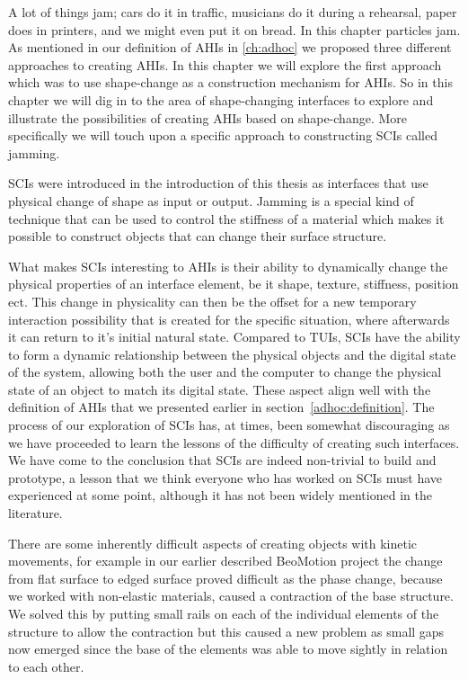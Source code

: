 
A lot of things jam; cars do it in traffic, musicians do it during a rehearsal, paper does in printers, and we might even put it on bread.
In this chapter particles jam.
\blank
As mentioned in our definition of AHIs in \autoref{ch:adhoc} we proposed three different approaches to creating AHIs.
In this chapter we will explore the first approach which was to use shape-change as a construction mechanism for AHIs.
So in this chapter we will dig in to the area of shape-changing interfaces to explore and illustrate the possibilities of creating AHIs based on shape-change.
More specifically we will touch upon a specific approach to constructing SCIs called jamming.

SCIs were introduced in the introduction of this thesis as interfaces that use physical change of shape as input or output.
Jamming is a special kind of technique that can be used to control the stiffness of a material which makes it possible to construct objects that can change their surface structure.

What makes SCIs interesting to AHIs is their ability to dynamically change the physical properties of an interface element, be it shape, texture, stiffness, position ect.
This change in physicality can then be the offset for a new temporary interaction possibility that is created for the specific situation, where afterwards it can return to it's initial natural state.
Compared to TUIs, SCIs have the ability to form a dynamic relationship between the physical objects and the digital state of the system, allowing both the user and the computer to change the physical state of an object to match its digital state.
These aspect align well with the definition of AHIs that we presented earlier in section~\ref{adhoc:definition}.
\blank
The process of our exploration of SCIs has, at times, been somewhat discouraging as we have proceeded to learn the lessons of the difficulty of creating such interfaces.
We have come to the conclusion that SCIs are indeed non-trivial to build and prototype, a lesson that we think everyone who has worked on SCIs must have experienced at some point, although it has not been widely mentioned in the literature. 

There are some inherently difficult aspects of creating objects with kinetic movements, for example in our earlier described BeoMotion project the change from flat surface to edged surface proved difficult as the phase change, because we worked with non-elastic materials, caused a contraction of the base structure.
We solved this by putting small rails on each of the individual elements of the structure to allow the contraction but this caused a new problem as small gaps now emerged since the base of the elements was able to move sightly in relation to each other.

